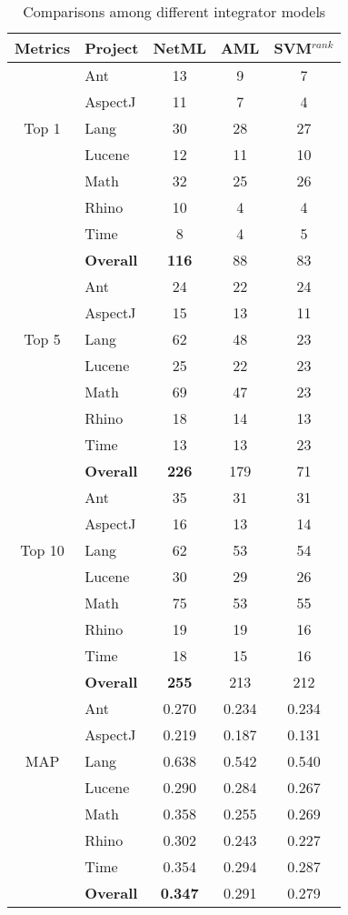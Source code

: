 \begin{table}[t!]
\centering
\caption{Comparisons among different integrator models}
\begin{tabular}{|c|l|c|c|c|}
\hline
\textbf{Metrics}& \textbf{Project}& \textbf{NetML} &\textbf{AML} & \textbf{SVM$^{rank}$}\\
    \hline\hline
\multirow{5}{*}{Top 1} & Ant&13&9&7\\
& AspectJ&11&7&4\\
& Lang&30&28&27\\
& Lucene&12&11&10\\
& Math&32&25&26\\
& Rhino&10&4&4\\
& Time&8&4&5\\
\cline{2-5}
&  {\textbf{Overall}}&\textbf{116}&88&83\\

\hline
\multirow{5}{*}{Top 5} &Ant&24&22&24\\
& AspectJ&15&13&11\\
&Lang&62&48&23\\
&Lucene&25&22&23\\
&Math&69&47&23\\
&Rhino&18&14&13\\
&Time&13&13&23\\
        \cline{2-5}
		&{\textbf{Overall}}&\textbf{226}&179&71\\
\hline
\multirow{5}{*}{Top 10} &     Ant&35&31&31\\
&     AspectJ&16&13&14\\
&    Lang&62&53&54\\
&    Lucene&30&29&26\\
&   Math&75&53&55\\
&   Rhino&19&19&16\\
&   Time&18&15&16\\
\cline{2-5}
&  {\textbf{Overall}}&\textbf{255}&213&212\\
\hline
\multirow{5}{*}{MAP}&     Ant&0.270&0.234&0.234\\
&     AspectJ&0.219&0.187&0.131\\
&     Lang&0.638&0.542&0.540\\
&    Lucene&0.290&0.284&0.267\\
&     Math&0.358&0.255&0.269\\
&   Rhino&0.302&0.243&0.227\\
&   Time&0.354&0.294&0.287\\
\cline{2-5}
&  {\textbf{Overall}}&\textbf{0.347}&0.291&0.279\\
\hline
\end{tabular}
\label{tab:result_svmrank}
\end{table}


